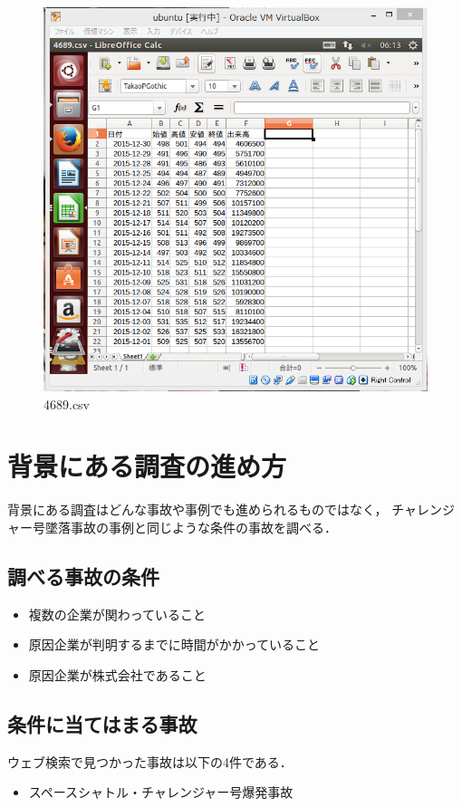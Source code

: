 {\begin{figure}[H]
\centering
\includegraphics[width=15cm]{4689csv.PNG}
\caption{4689.csv}\label{サンプル図}
\end{figure}



\section{背景にある調査の進め方}
背景にある調査はどんな事故や事例でも進められるものではなく，
チャレンジャー号墜落事故の事例と同じような条件の事故を調べる．



\subsection{調べる事故の条件}
\begin{itemize}
  \item 複数の企業が関わっていること
  \item 原因企業が判明するまでに時間がかかっていること
  \item 原因企業が株式会社であること

\end{itemize}


\subsection{条件に当てはまる事故}
ウェブ検索で見つかった事故は以下の4件である．
\begin{itemize}
  \item スペースシャトル・チャレンジャー号爆発事故


\end{itemize}}
